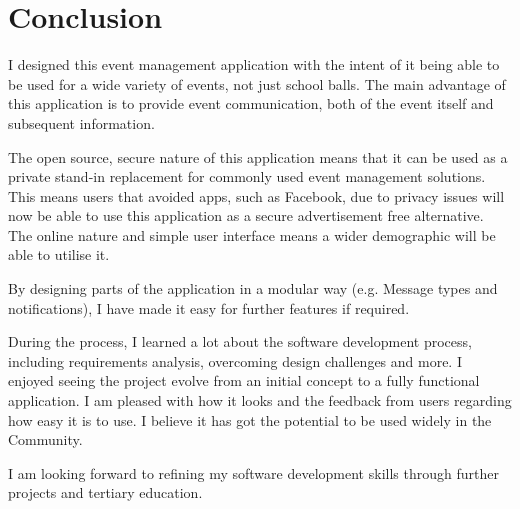 \documentclass[a4paper,oneside,12pt]{report}
\begin{document}

	\chapter{Conclusion}
	I designed this event management application with the intent of it being able to be used for a wide variety of events, not just school balls.  The main advantage of this application is to provide event communication, both of the event itself and subsequent information. 
    
    The open source, secure nature of this application means that it can be used as a private stand-in replacement for commonly used event management solutions. This means users that avoided apps, such as Facebook, due to privacy issues will now be able to use this application as a secure advertisement free alternative. The online nature and simple user interface means a wider demographic will be able to utilise it.
    
    By designing parts of the application in a modular way (e.g. Message types and notifications), I have made it easy for further features if required.
    
    During the process, I learned a lot about the software development process, including requirements analysis, overcoming design challenges and more. I enjoyed seeing the project evolve from an initial concept to a fully functional application. I am pleased with how it looks and the feedback from users regarding how easy it is to use. I believe it has got the potential to be used widely in the Community.
	
	I am looking forward to refining my software development skills through further projects and tertiary education.

	\printbibliography

	\printglossaries
\end{document}
